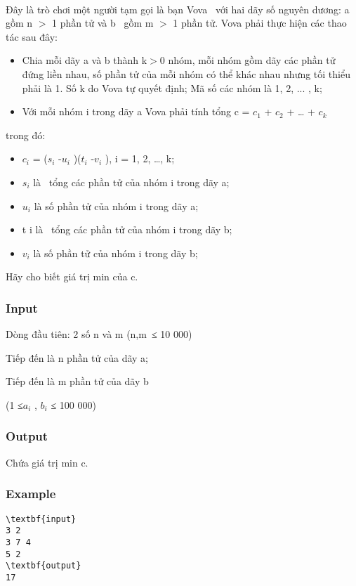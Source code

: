 

 

Đây là trò chơi một người tạm gọi là bạn Vova  với hai dãy số nguyên dương: a gồm n $>$ 1 phần tử và b  gồm m $>$ 1 phần tử. Vova phải thực hiện các thao tác sau đây:
\begin{itemize}
	\item Chia mỗi dãy a và b thành k$>$0 nhóm, mỗi nhóm gồm dãy các phần tử đứng liền nhau, số phần tử của mỗi nhóm có thể khác nhau nhưng tối thiểu phải là 1. Số k do Vova tự quyết định; Mã số các nhóm là 1, 2, ... , k;
	\item Với mỗi nhóm i trong dãy a Vova phải tính tổng c = $c_{1}$ + $c_{2}$ + … + $c_{k}$
\end{itemize}

trong đó:
\begin{itemize}
	\item $c_{i}$ = ($s_{i}$ -$u_{i}$ )($t_{i}$ -$v_{i}$ ), i = 1, 2, …, k;
	\item $s_{i}$ là  tổng các phần tử của nhóm i trong dãy a;
	\item $u_{i}$ là số phần tử của nhóm i trong dãy a;
	\item t i là  tổng các phần tử của nhóm i trong dãy b;
	\item $v_{i}$ là số phần tử của nhóm i trong dãy b;
\end{itemize}

Hãy cho biết giá trị min của c.

\subsubsection{Input}

Dòng đầu tiên: 2 số n và m (n,m ≤ 10 000)

Tiếp đến là n phần tử của dãy a;

Tiếp đến là m phần tử của dãy b

(1 ≤$a_{i}$ , $b_{i}$ ≤ 100 000)

\subsubsection{Output}

Chứa giá trị min c.

\subsubsection{Example}
\begin{verbatim}
\textbf{input}
3 2
3 7 4
5 2
\textbf{output}
17\end{verbatim}
